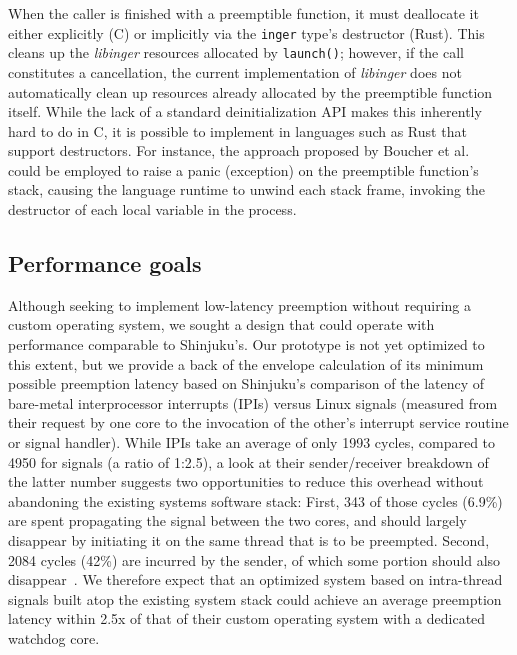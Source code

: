 When the caller is finished with a preemptible function, it must deallocate it
either explicitly (C) or implicitly via the \texttt{inger} type's destructor
(Rust).  This cleans up the \textit{libinger} resources allocated by
\texttt{launch()};
however, if the call constitutes a cancellation, the current implementation of
\textit{libinger} does not automatically clean up resources already allocated by the
preemptible function itself.  While the lack of a standard deinitialization API
makes this inherently hard to do in C, it is possible to implement in languages
such as Rust that support destructors.  For instance, the approach proposed by
Boucher et al.~\cite{boucher:atc2018} could be employed to raise a panic
(exception) on the preemptible function's stack, causing the language runtime
to unwind each stack frame, invoking the destructor of each local variable in
the process.


\subsection{Performance goals}

Although seeking to implement low-latency preemption without requiring a custom
operating system, we sought a design that could operate with performance
comparable to Shinjuku's.  Our prototype is not yet optimized to this extent,
but we provide a back of the envelope calculation of its minimum possible
preemption latency based on Shinjuku's comparison of the latency of bare-metal
interprocessor interrupts (IPIs) versus Linux signals (measured from their
request by one core to the invocation of the other's interrupt service routine
or signal handler).  While IPIs take an average of only 1993 cycles, compared
to 4950 for signals (a ratio of 1:2.5), a look at their sender/receiver
breakdown of the latter number suggests two opportunities to reduce this
overhead without abandoning the existing systems software stack:  First, 343 of
those cycles (6.9\%) are spent propagating the signal between the two cores,
and should largely disappear by initiating it on the same thread that is to be
preempted.  Second, 2084 cycles (42\%) are incurred by the sender, of which
some portion should also disappear~\cite{Kaffes:nsdi2019}.  We therefore expect
that an optimized system based on intra-thread signals built atop the existing
system stack could achieve an average preemption latency within 2.5x of that of
their custom operating system with a dedicated watchdog core.
